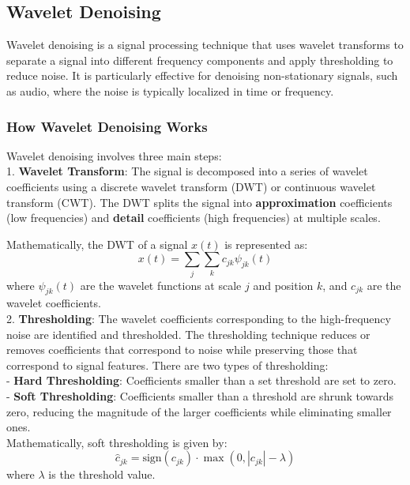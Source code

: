 \documentclass{article}
\begin{document}
\newpage

\subsection{Wavelet Denoising}
Wavelet denoising is a signal processing technique that uses wavelet transforms to separate a signal into different frequency components and apply thresholding to reduce noise. It is particularly effective for denoising non-stationary signals, such as audio, where the noise is typically localized in time or frequency.

\subsubsection{How Wavelet Denoising Works}
Wavelet denoising involves three main steps:  \\

1. \textbf{Wavelet Transform}: The signal is decomposed into a series of wavelet coefficients using a discrete wavelet transform (DWT) or continuous wavelet transform (CWT). The DWT splits the signal into \textbf{approximation} coefficients (low frequencies) and \textbf{detail} coefficients (high frequencies) at multiple scales.
   
   Mathematically, the DWT of a signal \( x(t) \) is represented as:
   \[
   x(t) = \sum_{j} \sum_{k} c_{jk} \psi_{jk}(t)
   \]
   where \( \psi_{jk}(t) \) are the wavelet functions at scale \( j \) and position \( k \), and \( c_{jk} \) are the wavelet coefficients. \\

2. \textbf{Thresholding}: The wavelet coefficients corresponding to the high-frequency noise are identified and thresholded. The thresholding technique reduces or removes coefficients that correspond to noise while preserving those that correspond to signal features. There are two types of thresholding: \\
   - \textbf{Hard Thresholding}: Coefficients smaller than a set threshold are set to zero. \\
   - \textbf{Soft Thresholding}: Coefficients smaller than a threshold are shrunk towards zero, reducing the magnitude of the larger coefficients while eliminating smaller ones. \\

   Mathematically, soft thresholding is given by:
   \[
   \hat{c}_{jk} = \text{sign}(c_{jk}) \cdot \max(0, |c_{jk}| - \lambda)
   \]
   where \( \lambda \) is the threshold value. \\
\end{document}
